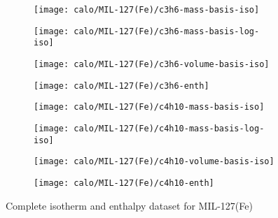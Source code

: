 \begin{figure}[H]
    \begin{subfigure}{0.25\textwidth}
        \texttt{[image: calo/MIL-127(Fe)/c3h6-mass-basis-iso]}%
        \label{appx:fig:shaping:mil127c3h6mass}
    \end{subfigure}%
    \begin{subfigure}{0.25\textwidth}
        \texttt{[image: calo/MIL-127(Fe)/c3h6-mass-basis-log-iso]}%
        \label{appx:fig:shaping:mil127c3h6masslog}
    \end{subfigure}%
    \begin{subfigure}{0.25\textwidth}
        \texttt{[image: calo/MIL-127(Fe)/c3h6-volume-basis-iso]}%
        \label{appx:fig:shaping:mil127c3h6volume}
    \end{subfigure}%
    \begin{subfigure}{0.25\textwidth}
        \texttt{[image: calo/MIL-127(Fe)/c3h6-enth]}%
        \label{appx:fig:shaping:mil127c3h6enth}
    \end{subfigure}%

    \begin{subfigure}{0.25\textwidth}
        \texttt{[image: calo/MIL-127(Fe)/c4h10-mass-basis-iso]}%
        \label{appx:fig:shaping:mil127c4h10mass}
    \end{subfigure}%
    \begin{subfigure}{0.25\textwidth}
        \texttt{[image: calo/MIL-127(Fe)/c4h10-mass-basis-log-iso]}%
        \label{appx:fig:shaping:mil127c4h10masslog}
    \end{subfigure}%
    \begin{subfigure}{0.25\textwidth}
        \texttt{[image: calo/MIL-127(Fe)/c4h10-volume-basis-iso]}%
        \label{appx:fig:shaping:mil127c4h10volume}
    \end{subfigure}%
    \begin{subfigure}{0.25\textwidth}
        \texttt{[image: calo/MIL-127(Fe)/c4h10-enth]}%
        \label{appx:fig:shaping:mil127c4h10enth}
    \end{subfigure}%

    \caption{Complete isotherm and enthalpy dataset for MIL-127(Fe)}%
    \label{appx:fig:shaping:calomil127}
\end{figure}

